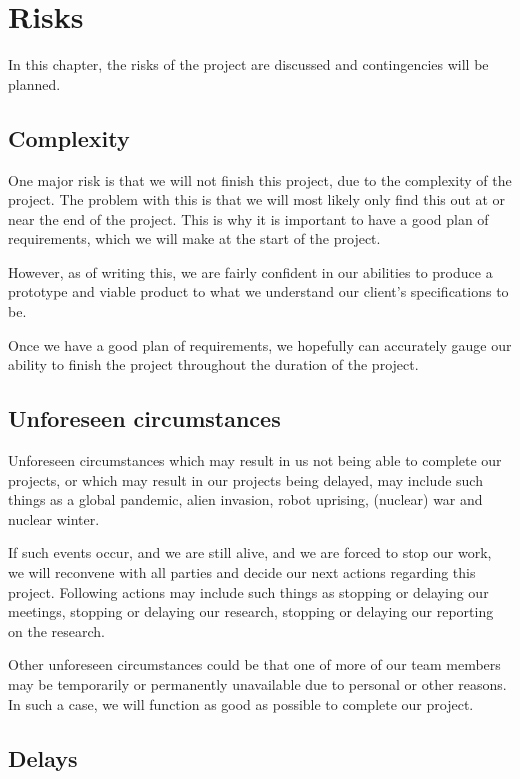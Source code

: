 \chapter{Risks} %

In this chapter, the risks of the project are discussed and contingencies will be planned.

\section{Complexity}

One major risk is that we will not finish this project, due to the complexity
of the project. The problem with this is that we will most likely only find
this out at or near the end of the project. This is why it is important to have
a good plan of requirements, which we will make at the start of the project.

However, as of writing this, we are fairly confident in our abilities to
produce a prototype and viable product to what we understand our client's
specifications to be.

Once we have a good plan of requirements, we hopefully can accurately gauge our
ability to finish the project throughout the duration of the project.

\section{Unforeseen circumstances}

Unforeseen circumstances which may result in us not being able to complete
our projects, or which may result in our projects being delayed, may
include such things as a global pandemic, alien invasion, robot uprising,
(nuclear) war and nuclear winter.

If such events occur, and we are still alive, and we are forced to stop our
work, we will reconvene with all parties and decide our next actions regarding
this project. Following actions may include such things as stopping or delaying
our meetings, stopping or delaying our research, stopping or delaying our
reporting on the research.

Other unforeseen circumstances could be that one of more of our team members
may be temporarily or permanently unavailable due to personal or other reasons.
In such a case, we will function as good as possible to complete our project.

\section{Delays}

